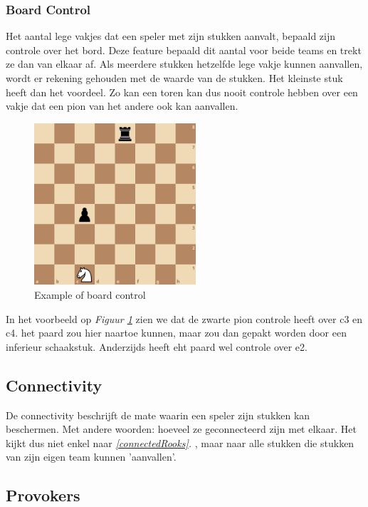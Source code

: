 \documentclass[a4paper,openany]{uantwerpenassignment}
\newcommand{\reference}[1]{\textit{\ref{#1}. \nameref{#1}}}
\newcommand{\figref}[1]{\textit{Figuur \ref{#1}}}
\begin{document}
\subsubsection{Board Control}
Het aantal lege vakjes dat een speler met zijn stukken aanvalt, bepaald zijn controle over het bord. Deze feature bepaald dit aantal voor beide teams en trekt ze dan van elkaar af. Als meerdere stukken hetzelfde lege vakje kunnen aanvallen, wordt er rekening gehouden met de waarde van de stukken. Het kleinste stuk heeft dan het voordeel. Zo kan een toren kan dus nooit controle hebben over een vakje dat een pion van het andere ook kan aanvallen. 

\begin{figure}[h]
    \centering
    \includegraphics[width=170pt]{images/boardControl.png}
    \caption{Example of board control}
    \label{fig:boardcontrol}
\end{figure}

In het voorbeeld op \figref{fig:boardcontrol} zien we dat de zwarte pion controle heeft over c3 en c4. het paard zou hier naartoe kunnen, maar zou dan gepakt worden door een inferieur schaakstuk. Anderzijds heeft eht paard wel controle over e2.

\subsection{Connectivity}
\label{connectivity}

De connectivity beschrijft de mate waarin een speler zijn stukken kan beschermen. Met andere woorden: hoeveel ze geconnecteerd zijn met elkaar. Het kijkt dus niet enkel naar \reference{connectedRooks}, maar naar alle stukken die stukken van zijn eigen team kunnen 'aanvallen'. 

\subsection{Provokers}
\end{document}
